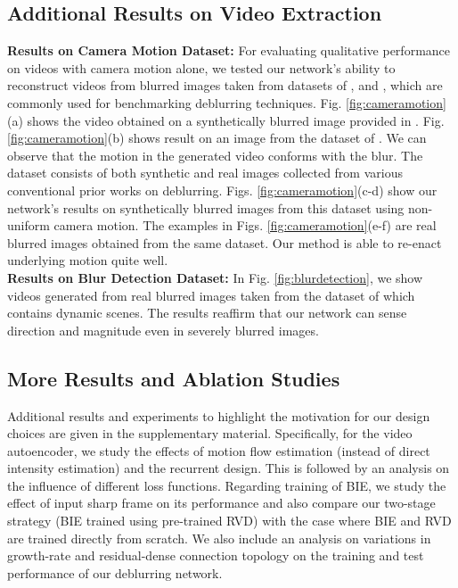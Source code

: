 \documentclass[10pt,twocolumn,letterpaper]{article}
\begin{document}
\subsection{Additional Results on Video Extraction}

\noindent \textbf{Results on Camera Motion Dataset:}
For evaluating qualitative performance on videos with camera motion alone, we tested our network's ability to reconstruct videos from blurred images taken from datasets of \cite{gong2017motion}, \cite{kohler2012recording} and \cite{lai2016comparative}, which are commonly used for benchmarking deblurring techniques. Fig. \ref{fig:cameramotion}(a) shows the video obtained on a synthetically blurred image provided in \cite{gong2017motion}. Fig. \ref{fig:cameramotion}(b) shows result on an image from the dataset of \cite{kohler2012recording}. We can observe that the motion in the generated video conforms with the blur. The dataset \cite{lai2016comparative} consists of both synthetic and real images collected from various conventional prior works on deblurring. Figs. \ref{fig:cameramotion}(c-d) show our network's results on synthetically blurred images from this dataset using non-uniform camera motion. The examples in Figs. \ref{fig:cameramotion}(e-f) are real blurred images obtained from the same dataset. Our method is able to re-enact underlying motion quite well. 
\\
\textbf{Results on Blur Detection Dataset:}
In Fig. \ref{fig:blurdetection}, we show videos generated from real blurred images taken from the dataset of \cite{shi2014discriminative} which contains dynamic scenes. The results reaffirm that our network can sense direction and magnitude even in severely blurred images. 

\subsection{More Results and Ablation Studies}

Additional results and experiments to highlight the motivation for our design choices are given in the supplementary material. Specifically, for the video autoencoder, we study the effects of motion flow estimation (instead of direct intensity estimation) and the recurrent design. This is followed by an analysis on the influence of different loss functions. Regarding training of BIE, we study the effect of input sharp frame on its performance and also compare our two-stage strategy (BIE trained using pre-trained RVD) with the case where BIE and RVD are trained directly from scratch. We also include an analysis on variations in growth-rate and residual-dense connection topology on the training and test performance of our deblurring network. 
\end{document}
